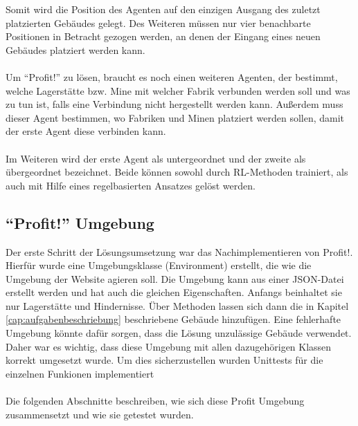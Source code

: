Somit wird die Position des Agenten auf den einzigen Ausgang des zuletzt platzierten Gebäudes gelegt. Des Weiteren müssen nur vier benachbarte Positionen in Betracht gezogen werden, an denen der Eingang eines neuen Gebäudes platziert werden kann. 
\\\\
Um “Profit!” zu lösen, braucht es noch einen weiteren Agenten, der bestimmt, welche Lagerstätte bzw. Mine mit welcher Fabrik verbunden werden soll und was zu tun ist, falls eine Verbindung nicht hergestellt werden kann. Außerdem muss dieser Agent bestimmen, wo Fabriken und Minen platziert werden sollen, damit der erste Agent diese verbinden kann.
\\\\
Im Weiteren wird der erste Agent als untergeordnet und der zweite als übergeordnet bezeichnet. Beide können sowohl durch RL-Methoden trainiert, als auch mit Hilfe eines regelbasierten Ansatzes gelöst werden. 

\subsection{“Profit!” Umgebung}
Der erste Schritt der Lösungsumsetzung war das Nachimplementieren von \dq{}Profit!\dq.  Hierfür wurde eine Umgebungsklasse (Environment) erstellt, die wie die Umgebung der Website agieren soll. Die Umgebung kann aus einer JSON-Datei erstellt werden und hat auch die gleichen Eigenschaften. Anfangs beinhaltet sie nur Lagerstätte und Hindernisse. Über Methoden lassen sich dann die in Kapitel \ref{cap:aufgabenbeschriebung} beschriebene Gebäude hinzufügen.
Eine fehlerhafte Umgebung könnte dafür sorgen, dass die Lösung unzulässige Gebäude verwendet.
Daher war es wichtig, dass diese Umgebung mit allen dazugehörigen Klassen korrekt umgesetzt wurde. Um dies sicherzustellen wurden Unittests für die einzelnen Funkionen implementiert
\\\\
Die folgenden Abschnitte beschreiben, wie sich diese Profit Umgebung zusammensetzt und wie sie getestet wurden.

